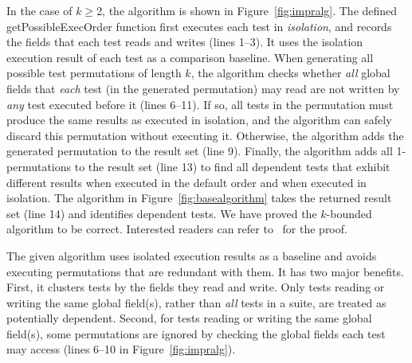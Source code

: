In the case of $k$$\ge$2, the algorithm
is shown in Figure~\ref{fig:impralg}.
%
The defined getPossibleExecOrder function first executes
each test in \textit{isolation}, and records the
fields that each test reads and writes (lines 1--3).
It uses the isolation execution result
of each test as a comparison baseline.
When generating all possible test permutations
of length $k$, the algorithm checks whether
\textit{all} global fields that \textit{each} test (in the generated permutation)
may read are not written by \textit{any} test executed before it (lines 6--11).
If so, all tests in the permutation
must produce the same results as executed in isolation,
and the algorithm can safely discard this permutation without
executing it. Otherwise, the algorithm adds the generated
permutation to the result set (line 9).
Finally, the algorithm adds all 1-permutations to
the result set (line 13)
to find all dependent tests that exhibit different results
when executed in the default order and when executed in isolation.
The algorithm in Figure~\ref{fig:basealgorithm} takes the
returned result set (line 14) and identifies dependent tests. %
%
We have proved the \dependenceaware{} $k$-bounded algorithm to be
correct. Interested
readers can refer to~\cite{testdependence} for the proof.

The given algorithm uses isolated execution results as a baseline and
avoids executing permutations that are redundant with them.
%
It has two major benefits.
First, it clusters tests by the fields they
read and write. Only tests reading or writing
the same global field(s), rather than \textit{all} tests
in a suite, are treated as potentially dependent.
Second, for tests reading or writing the same global
field(s), some permutations are ignored by checking
the global fields each test may access (lines 6--10 in
Figure~\ref{fig:impralg}). 



